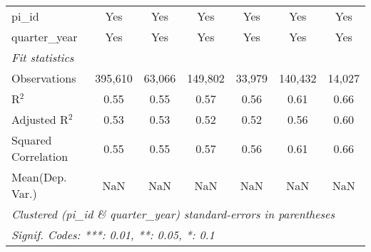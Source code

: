 \begin{tabular}{lcccccc}
   pi\_id                                                     & Yes           & Yes           & Yes           & Yes           & Yes           & Yes\\  
   quarter\_year                                              & Yes           & Yes           & Yes           & Yes           & Yes           & Yes\\  
   \midrule
   \emph{Fit statistics}\\
   Observations                                               & 395,610       & 63,066        & 149,802       & 33,979        & 140,432       & 14,027\\  
   R$^2$                                                      & 0.55          & 0.55          & 0.57          & 0.56          & 0.61          & 0.66\\  
   Adjusted R$^2$                                             & 0.53          & 0.53          & 0.52          & 0.52          & 0.56          & 0.60\\  
   Squared Correlation                                        & 0.55          & 0.55          & 0.57          & 0.56          & 0.61          & 0.66\\  
Mean(Dep. Var.) & NaN & NaN & NaN & NaN & NaN & NaN \\
   \midrule \midrule
   \multicolumn{7}{l}{\emph{Clustered (pi\_id \& quarter\_year) standard-errors in parentheses}}\\
   \multicolumn{7}{l}{\emph{Signif. Codes: ***: 0.01, **: 0.05, *: 0.1}}\\
\end{tabular}
\par\endgroup
